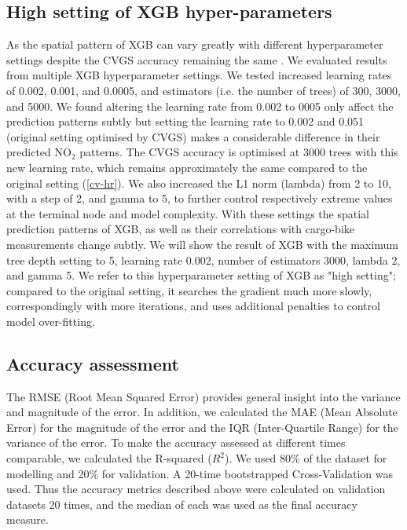 \documentclass{article}
\begin{document}
\subsection{High setting of XGB hyper-parameters}
As the spatial pattern of XGB can vary greatly with different hyperparameter settings despite the CVGS accuracy remaining the same \citep{luglobal}. We evaluated results from multiple XGB hyperparameter settings. We tested increased learning rates of 0.002, 0.001, and 0.0005, and estimators (i.e. the number of trees) of 300, 3000, and 5000. We found altering the learning rate from 0.002 to 0005 only affect the prediction patterns subtly but setting the learning rate to 0.002 and 0.051 (original setting optimised by CVGS) makes a considerable difference in their predicted NO$_2$ patterns. The CVGS accuracy is optimised at 3000 trees with this new learning rate, which remains approximately the same compared to the original setting (\cref{cv-hr}). We also increased the L1 norm (lambda) from 2 to 10, with a step of 2, and gamma \citep{chen2016xgboost} to 5, to further control respectively extreme values at the terminal node and model complexity. With these settings the spatial prediction patterns of XGB, as well as their correlations with cargo-bike measurements change subtly. We will show the result of XGB with the maximum tree depth setting to 5, learning rate 0.002, number of estimators 3000, lambda 2, and gamma 5. We refer to this hyperparameter setting of XGB as "high setting"; compared to the original setting, it searches the gradient much more slowly, correspondingly with more iterations, and uses additional penalties to control model over-fitting. 

 
\subsection{Accuracy assessment}

The RMSE (Root Mean Squared Error) provides general insight into the variance and magnitude of the error. In addition, we calculated the MAE (Mean Absolute Error) for the magnitude of the error and the IQR (Inter-Quartile Range) for the variance of the error. To make the accuracy assessed at different times comparable, we calculated the R-squared ($R^2$). We used 80\% of the dataset for modelling and 20\% for validation. A 20-time bootstrapped Cross-Validation was used. Thus the accuracy metrics described above were calculated on validation datasets 20 times, and the median of each was used as the final accuracy measure.    
\end{document}

